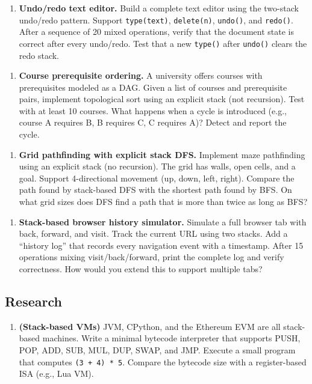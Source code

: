 \begin{enumerate}
\item \textbf{Undo/redo text editor.} Build a complete text editor using the two-stack undo/redo pattern. Support \texttt{type(text)}, \texttt{delete(n)}, \texttt{undo()}, and \texttt{redo()}. After a sequence of 20 mixed operations, verify that the document state is correct after every undo/redo. Test that a new \texttt{type()} after \texttt{undo()} clears the redo stack.
\end{enumerate}

\begin{enumerate}
\item \textbf{Course prerequisite ordering.} A university offers courses with prerequisites modeled as a DAG. Given a list of courses and prerequisite pairs, implement topological sort using an explicit stack (not recursion). Test with at least 10 courses. What happens when a cycle is introduced (e.g., course A requires B, B requires C, C requires A)? Detect and report the cycle.
\end{enumerate}

\begin{enumerate}
\item \textbf{Grid pathfinding with explicit stack DFS.} Implement maze pathfinding using an explicit stack (no recursion). The grid has walls, open cells, and a goal. Support 4-directional movement (up, down, left, right). Compare the path found by stack-based DFS with the shortest path found by BFS. On what grid sizes does DFS find a path that is more than twice as long as BFS?
\end{enumerate}

\begin{enumerate}
\item \textbf{Stack-based browser history simulator.} Simulate a full browser tab with back, forward, and visit. Track the current URL using two stacks. Add a ``history log'' that records every navigation event with a timestamp. After 15 operations mixing visit/back/forward, print the complete log and verify correctness. How would you extend this to support multiple tabs?
\end{enumerate}

\subsection{Research}

\begin{enumerate}
\item \textbf{(Stack-based VMs)} JVM, CPython, and the Ethereum EVM are all stack-based machines. Write a minimal bytecode interpreter that supports PUSH, POP, ADD, SUB, MUL, DUP, SWAP, and JMP. Execute a small program that computes \texttt{(3 + 4) * 5}. Compare the bytecode size with a register-based ISA (e.g., Lua VM).
\end{enumerate}

